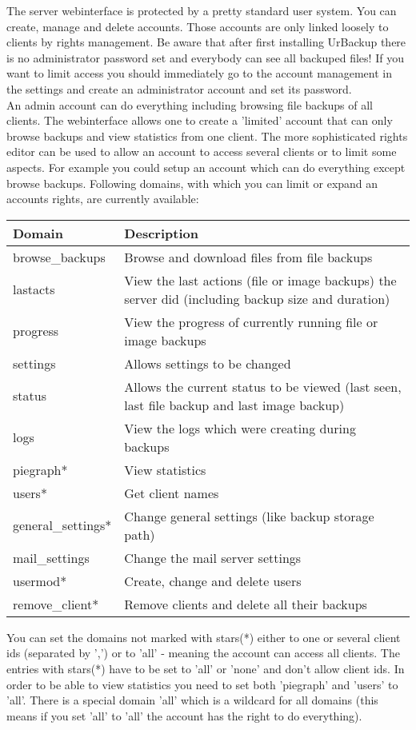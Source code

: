 \documentclass[a4paper,10pt]{article}
\begin{document}
The server webinterface is protected by a pretty standard user system. You can create, manage and delete accounts. Those accounts are only linked loosely to clients by rights management. Be aware that after first installing UrBackup there is no administrator password set and everybody can see all backuped files! If you want to limit access you should immediately go to the account management in the settings and create an administrator account and set its password.\\
An admin account can do everything including browsing file backups of all clients. The webinterface allows one to create a 'limited' account that can only browse backups and view statistics from one client. The more sophisticated rights editor can be used to allow an account to access several clients or to limit some aspects. For example you could setup an account which can do everything except browse backups.
Following domains, with which you can limit or expand an accounts rights, are currently available:

\begin{tabular}{|l|p{}|}
\hline
Domain  & Description \\
\hline\hline
browse\_backups & Browse and download files from file backups\\
lastacts & View the last actions (file or image backups) the server did (including backup size and duration)\\
progress & View the progress of currently running file or image backups\\
settings & Allows settings to be changed\\
status & Allows the current status to be viewed (last seen, last file backup and last image backup)\\
logs & View the logs which were creating during backups\\
piegraph* & View statistics\\
users* & Get client names\\
general\_settings* & Change general settings (like backup storage path)\\
mail\_settings & Change the mail server settings \\
usermod* & Create, change and delete users\\
remove\_client* & Remove clients and delete all their backups\\
\hline
\end{tabular}

You can set the domains not marked with stars(*) either to one or several client ids (separated by ',') or to 'all' - meaning the account can access all clients. The entries with stars(*) have to be set to 'all' or 'none' and don't allow client ids. In order to be able to view statistics you need to set both 'piegraph' and 'users' to 'all'. There is a special domain 'all' which is a wildcard for all domains (this means if you set 'all' to 'all' the account has the right to do everything). 
\end{document}
